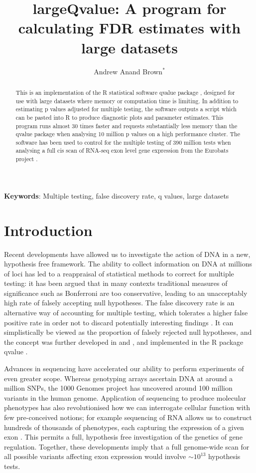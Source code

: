 \documentclass{amsart}
\author[]{Andrew Anand Brown$^*$}
\title[largeQvalue]{largeQvalue: A program for calculating FDR estimates with large datasets}
\begin{document}
\maketitle

\linespread{1.6}

\begin{abstract}
This is an implementation of the R statistical software qvalue package \citep{qvalue}, designed for use with large datasets where memory or computation time is limiting. In addition to estimating p values adjusted for multiple testing, the software outputs a script which can be pasted into R to produce diagnostic plots and parameter estimates. This program runs almost 30 times faster and requests substantially less memory than the qvalue package when analysing 10 million p values on a high performance cluster. The software has been used to control for the multiple testing of 390 million tests when analysing a full cis scan of RNA-seq exon level gene expression from the Eurobats project \citep{brownepistasis}.
\end{abstract}

\bigskip

\noindent \small{\textbf{Keywords}: Multiple testing, false discovery rate, q values, large datasets}

\bigskip

\section{Introduction}

Recent developments have allowed us to investigate the action of DNA in a new, hypothesis free framework. The ability to collect information on DNA at millions of loci has led to a reappraisal of statistical methods to correct for multiple testing: it has been argued that in many contexts traditional measures of significance such as Bonferroni are too conservative, leading to an unacceptably high rate of falsely accepting null hypotheses. The false discovery rate is an alternative way of accounting for multiple testing, which tolerates a higher false positive rate in order not to discard potentially interesting findings \citep{fdr}. It can simplistically be viewed as the proportion of falsely rejected null hypotheses, and the concept was further developed in \citet{splinestorey} and \citet{bootstorey}, and implemented in the R package qvalue \citep{qvalue}.

Advances in sequencing have accelerated our ability to perform experiments of even greater scope. Whereas genotyping arrays ascertain DNA at around a million SNPs, the 1000 Genomes project \citep{1kg} has uncovered around 100 million variants in the human genome. Application of sequencing to produce molecular phenotypes has also revolutionised how we can interrogate cellular function with few pre-conceived notions; for example sequencing of RNA allows us to construct hundreds of thousands of phenotypes, each capturing the expression of a given exon \citep{geuvadis}. This permits a full, hypothesis free investigation of the genetics of gene regulation. Together, these developments imply that a full genome-wide scan for all possible variants affecting exon expression would involve $\sim 10^{13}$ hypothesis tests.
\end{document}
